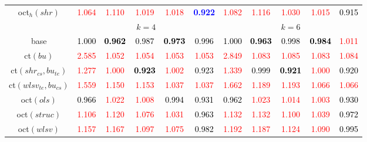 \begin{tabular}[t]{c|>{}cccc>{}c|ccccc}
oct$_h(shr)$ & \textcolor{red}{1.064} & \textcolor{red}{1.110} & \textcolor{red}{1.019} & \textcolor{red}{1.018} & \textcolor{blue}{\textbf{0.922}} & \textcolor{red}{1.082} & \textcolor{red}{1.116} & \textcolor{red}{1.030} & \textcolor{red}{1.015} & \textcolor{black}{0.915}\\
\addlinespace[0.3em]
\multicolumn{1}{c}{} & \multicolumn{5}{c}{\textbf{$k = 4$}} & \multicolumn{5}{c}{\textbf{$k = 6$}}\\
base & \textcolor{black}{1.000} & \textcolor{black}{\textbf{0.962}} & \textcolor{black}{0.987} & \textcolor{black}{\textbf{0.973}} & \textcolor{black}{0.996} & \textcolor{black}{1.000} & \textcolor{black}{\textbf{0.963}} & \textcolor{black}{0.998} & \textcolor{black}{\textbf{0.984}} & \textcolor{red}{1.011}\\
ct$(bu)$ & \textcolor{red}{2.585} & \textcolor{red}{1.052} & \textcolor{red}{1.054} & \textcolor{red}{1.053} & \textcolor{red}{1.053} & \textcolor{red}{2.849} & \textcolor{red}{1.083} & \textcolor{red}{1.085} & \textcolor{red}{1.083} & \textcolor{red}{1.084}\\
ct$(shr_{cs}, bu_{te})$ & \textcolor{red}{1.277} & \textcolor{red}{1.000} & \textcolor{black}{\textbf{0.923}} & \textcolor{red}{1.002} & \textcolor{black}{0.923} & \textcolor{red}{1.339} & \textcolor{black}{0.999} & \textcolor{black}{\textbf{0.921}} & \textcolor{red}{1.000} & \textcolor{black}{0.920}\\
ct$(wlsv_{te}, bu_{cs})$ & \textcolor{red}{1.559} & \textcolor{red}{1.150} & \textcolor{red}{1.153} & \textcolor{red}{1.037} & \textcolor{red}{1.037} & \textcolor{red}{1.662} & \textcolor{red}{1.189} & \textcolor{red}{1.193} & \textcolor{red}{1.066} & \textcolor{red}{1.066}\\
oct$(ols)$ & \textcolor{black}{0.966} & \textcolor{red}{1.022} & \textcolor{red}{1.008} & \textcolor{black}{0.994} & \textcolor{black}{0.931} & \textcolor{black}{0.962} & \textcolor{red}{1.023} & \textcolor{red}{1.014} & \textcolor{red}{1.003} & \textcolor{black}{0.930}\\
oct$(struc)$ & \textcolor{red}{1.106} & \textcolor{red}{1.120} & \textcolor{red}{1.076} & \textcolor{red}{1.031} & \textcolor{black}{0.963} & \textcolor{red}{1.132} & \textcolor{red}{1.132} & \textcolor{red}{1.100} & \textcolor{red}{1.039} & \textcolor{black}{0.972}\\
oct$(wlsv)$ & \textcolor{red}{1.157} & \textcolor{red}{1.167} & \textcolor{red}{1.097} & \textcolor{red}{1.075} & \textcolor{black}{0.982} & \textcolor{red}{1.192} & \textcolor{red}{1.187} & \textcolor{red}{1.124} & \textcolor{red}{1.090} & \textcolor{black}{0.995}\\

\end{tabular}
